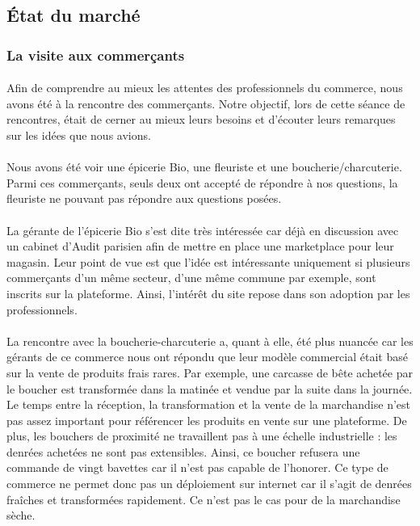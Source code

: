 \documentclass[a4paper, 12pt]{article}
\begin{document}
\subsection{État du marché}
\subsubsection{La visite aux commerçants}

\paragraph{}Afin de comprendre au mieux les attentes des professionnels du commerce, nous avons été à la rencontre des commerçants. Notre objectif, lors de cette séance de rencontres, était de cerner au mieux leurs besoins et d’écouter leurs remarques sur les idées que nous avions.
\paragraph{}Nous avons été voir une épicerie Bio, une fleuriste et une boucherie/charcuterie. Parmi ces commerçants, seuls deux ont accepté de répondre à nos questions, la fleuriste ne pouvant pas répondre aux questions posées.
\paragraph{}La gérante de l’épicerie Bio s’est dite très intéressée car déjà en discussion avec un cabinet d’Audit parisien afin de mettre en place une marketplace pour leur magasin. Leur point de vue est que l’idée est intéressante uniquement si plusieurs commerçants d’un même secteur, d’une même commune par exemple, sont inscrits sur la plateforme. Ainsi, l’intérêt du site repose dans son adoption par les professionnels.
\paragraph{}La rencontre avec la boucherie-charcuterie a, quant à elle, été plus nuancée car les gérants de ce commerce nous ont répondu que leur modèle commercial était basé sur la vente de produits frais rares. Par exemple, une carcasse de bête achetée par le boucher est transformée dans la matinée et vendue par la suite dans la journée. Le temps entre la réception, la transformation et la vente de la marchandise n’est pas assez important pour référencer les produits en vente sur une plateforme. De plus, les bouchers de proximité ne travaillent pas à une échelle industrielle : les denrées achetées ne sont pas extensibles. Ainsi, ce boucher refusera une commande de vingt bavettes car il n’est pas capable de l’honorer. Ce type de commerce ne permet donc pas un déploiement sur internet car il s’agit de denrées fraîches et transformées rapidement. Ce n’est pas le cas pour de la marchandise sèche.
\end{document}

